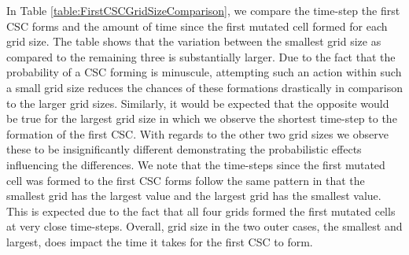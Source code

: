 \documentclass[\main/thesis.tex]{subfiles}
\begin{document}
In Table \ref{table:FirstCSCGridSizeComparison}, we compare the time-step the first CSC forms and the amount of time since the first mutated cell formed for each grid size. The table shows that the variation between the smallest grid size as compared to the remaining three is substantially larger. Due to the fact that the probability of a CSC forming is minuscule, attempting such an action within such a small grid size reduces the chances of these formations drastically in comparison to the larger grid sizes. Similarly, it would be expected that the opposite would be true for the largest grid size in which we observe the shortest time-step to the formation of the first CSC. With regards to the other two grid sizes we observe these to be insignificantly different demonstrating the probabilistic effects influencing the differences. We note that the time-steps since the first mutated cell was formed to the first CSC forms follow the same pattern in that the smallest grid has the largest value and the largest grid has the smallest value. This is expected due to the fact that all four grids formed the first mutated cells at very close time-steps. Overall, grid size in the two outer cases, the smallest and largest, does impact the time it takes for the first CSC to form. 
\begin{table}[H]
\centering
{}
\caption{In this table we compare the time-step the first CSC forms and the number of time-steps since the first mutated cell formed between the various grid sizes.}
\label{table:FirstCSCGridSizeComparison} 
\end{table}
\end{document}
